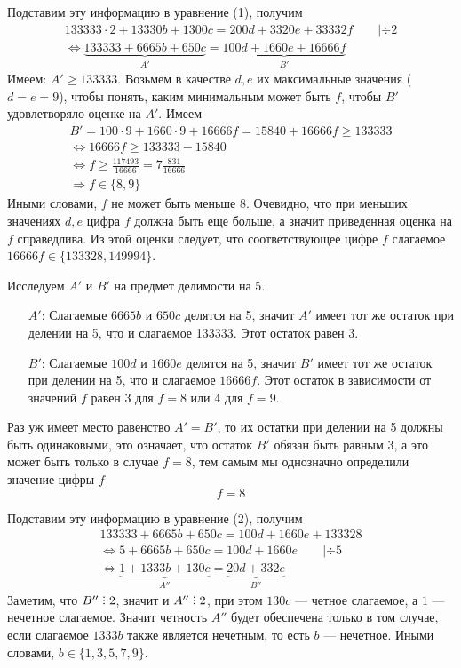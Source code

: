 \documentclass[12pt]{article}
\DeclareRobustCommand{\divby}{%
  \mathrel{\vbox{\baselineskip.65ex\lineskiplimit0pt\hbox{.}\hbox{.}\hbox{.}}}%
}
\begin{document}
    Подставим эту информацию в уравнение (1), получим
    \begin{gather}
        133333\cdot2 + 13330b + 1300c = 200d + 3320e + 33332f \qquad | \div 2 \nonumber \\
        \Longleftrightarrow \underbrace{133333 + 6665b + 650c}_{A'} = \underbrace{100d + 1660e + 16666f}_{B'}
    \end{gather}
    Имеем: $A' \geqslant 133333$. Возьмем в качестве $d, e$ их максимальные значения ($d = e = 9$), чтобы понять, каким минимальным может быть $f$, чтобы $B'$ удовлетворяло оценке на $A'$. Имеем 
    \begin{gather*}
        B' = 100\cdot9 + 1660\cdot9 + 16666f = 15840 + 16666f \geqslant 133333 \\
        \Longleftrightarrow 16666f \geqslant 133333 - 15840 \\
        \Longleftrightarrow f \geqslant \frac{117493}{16666} = 7\frac{831}{16666} \\
        \Longrightarrow f \in \{8, 9\}
    \end{gather*}
    Иными словами, $f$ не может быть меньше 8. Очевидно, что при меньших значениях $d, e$ цифра $f$ должна быть еще больше, а значит приведенная оценка на $f$ справедлива.
    Из этой оценки следует, что соответствующее цифре $f$ слагаемое $16666f \in \{133328, 149994\}$.

    Исследуем $A'$ и $B'$ на предмет делимости на 5. 
    \begin{itemize}
        \item[$A'$:] Слагаемые $6665b$ и $650c$ делятся на 5, значит $A'$ имеет тот же остаток при делении на 5, что и слагаемое 133333.
        Этот остаток равен 3.
        \item[$B'$:] Слагаемые $100d$ и $1660e$ делятся на 5, значит $B'$ имеет тот же остаток при делении на 5, что и слагаемое $16666f$.
        Этот остаток в зависимости от значений $f$ равен 3 для $f = 8$ или 4 для $f = 9$.
    \end{itemize}
    Раз уж имеет место равенство $A' = B'$, то их остатки при делении на 5 должны быть одинаковыми, это означает, что остаток $B'$ обязан быть равным 3, а это может быть только в случае $f = 8$, тем самым мы однозначно определили значение цифры $f$
    $$
        \boxed{f = 8}
    $$

    Подставим эту информацию в уравнение (2), получим
    \begin{gather}
        133333 + 6665b + 650c = 100d + 1660e + 133328 \nonumber \\
        \Longleftrightarrow 5 + 6665b + 650c = 100d + 1660e \qquad | \div 5 \nonumber \\
        \Longleftrightarrow \underbrace{1 + 1333b + 130c}_{A''} = \underbrace{20d + 332e}_{B''}
    \end{gather}
    Заметим, что $B'' \divby 2$, значит и $A'' \divby 2$, при этом $130c$ — четное слагаемое, а $1$ — нечетное слагаемое.
    Значит четность $A''$ будет обеспечена только в том случае, если слагаемое $1333b$ также является нечетным, то есть $b$ — нечетное. Иными словами, $b \in \{1, 3, 5, 7, 9\}$.
\end{document}
